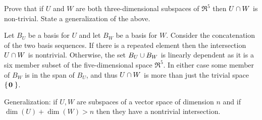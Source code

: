 
\begin{Exercise}[
name={},
title={}, 
difficulty=0,
origin={\cite{JH}}]
    Prove that if \( U \) and \( W \) are both three-dimensional
    subspaces of \( \Re^5 \) then \( U\cap W \) is non-trivial.
    State a generalization of the above.
\end{Exercise}

\begin{Answer}
       Let \( B_U \) be a basis for \( U \) and let \( B_W \)
       be a basis for \( W \).
       Consider the concatenation of the two basis sequences.
       If there is a repeated element then the intersection
       \( U\cap W \) is nontrivial.
       Otherwise, 
       the set \( B_U\cup B_W \) is linearly dependent as it is a
       six member subset of the five-dimensional space \( \Re^5 \).
       In either case some member of \( B_W \) is in the span of \( B_U \), and
       thus \( U\cap W \) is more than just the trivial space
       \( \mbox{$\left\{\hspace{0.1em}\bm{0}\,\hspace{0.1em}\right\}$} \).

       Generalization:
       if \( U,W \) are subspaces of a vector space of dimension \( n \) and
       if \( \dim(U)+\dim(W)>n \) then they have a nontrivial
       intersection.  
\end{Answer}
